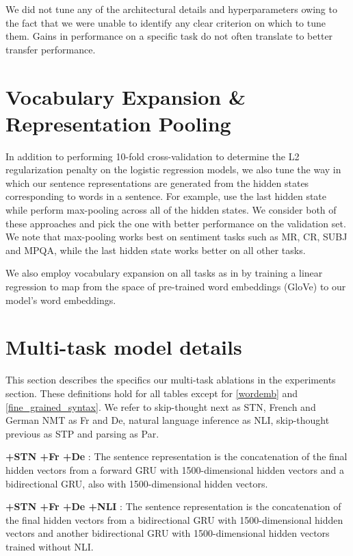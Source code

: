 \documentclass{article} \usepackage{iclr2018_conference,times}
\begin{document}
We did not tune any of the architectural details and hyperparameters owing to the fact that we were unable to identify any clear criterion on which to tune them. Gains in performance on a specific task do not often translate to better transfer performance.

\section{Vocabulary Expansion \& Representation Pooling}
In addition to performing 10-fold cross-validation to determine the L2 regularization penalty on the logistic regression models, we also tune the way in which our sentence representations are generated from the hidden states corresponding to words in a sentence. For example, \cite{kiros2015skip} use the last hidden state while \cite{conneau2017supervised} perform max-pooling across all of the hidden states. We consider both of these approaches and pick the one with better performance on the validation set. We note that max-pooling works best on sentiment tasks such as MR, CR, SUBJ and MPQA, while the last hidden state works better on all other tasks. 

We also employ vocabulary expansion on all tasks as in \cite{kiros2015skip} by training a linear regression to map from the space of pre-trained word embeddings (GloVe) to our model's word embeddings.

\section{Multi-task model details}
\label{label:ensemble}
This section describes the specifics our multi-task ablations in the experiments section. These definitions hold for all tables except for \ref{wordemb} and \ref{fine_grained_syntax}. We refer to skip-thought next as STN, French and German NMT as Fr and De, natural language inference as NLI, skip-thought previous as STP and parsing as Par.

\textbf{+STN +Fr +De} : The sentence representation  is the concatenation of the final hidden vectors from a forward GRU with 1500-dimensional hidden vectors and a bidirectional GRU, also with 1500-dimensional hidden vectors.

\textbf{+STN +Fr +De +NLI} : The sentence representation  is the concatenation of the final hidden vectors from a bidirectional GRU with 1500-dimensional hidden vectors and another bidirectional GRU with 1500-dimensional hidden vectors trained without NLI.
\end{document}
